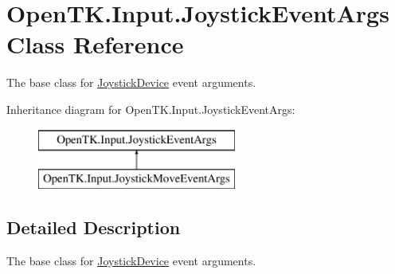 \hypertarget{class_open_t_k_1_1_input_1_1_joystick_event_args}{\section{Open\-T\-K.\-Input.\-Joystick\-Event\-Args Class Reference}
\label{class_open_t_k_1_1_input_1_1_joystick_event_args}
}


The base class for \hyperlink{class_open_t_k_1_1_input_1_1_joystick_device}{Joystick\-Device} event arguments.  


Inheritance diagram for Open\-T\-K.\-Input.\-Joystick\-Event\-Args\-:\begin{figure}[H]
\begin{center}
\leavevmode
\includegraphics[height=2.000000cm]{class_open_t_k_1_1_input_1_1_joystick_event_args}
\end{center}
\end{figure}


\subsection{Detailed Description}
The base class for \hyperlink{class_open_t_k_1_1_input_1_1_joystick_device}{Joystick\-Device} event arguments. 

